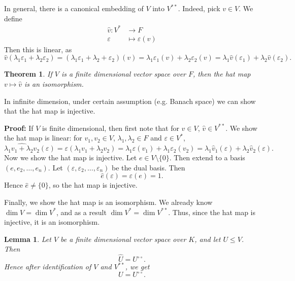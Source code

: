 \documentclass[12pt]{article}
\newtheorem{theorem}{Theorem}[section]
\newtheorem{lemma}{Lemma}[section]
\theoremstyle{definition}
\theoremstyle{remark}
\begin{document}
In general, there is a canonical embedding of $V$ into $V^{\ast \ast}$. Indeed, pick $v \in V$. We define
\begin{align*}
	\hat v : V^{\ast} &\to F \\
	\varepsilon &\mapsto \varepsilon(v)
\end{align*}
Then this is linear, as
\[
	\hat v(\lambda_1 \varepsilon_1 + \lambda_2 \varepsilon_2) = (\lambda_1 \varepsilon_1 + \lambda_2 + \varepsilon_2)(v) = \lambda_1 \varepsilon_1(v) + \lambda_2 \varepsilon_2(v) = \lambda_1 \hat v(\varepsilon_1) + \lambda_2 \hat v(\varepsilon_2)
.\]

\begin{theorem}
	If $V$ is a finite dimensional vector space over $F$, then the hat map $v \mapsto \hat v$ is an isomorphism.
\end{theorem}

In infinite dimension, under certain assumption (e.g. Banach space) we can show that the hat map is injective.

\begin{adjustbox}{minipage = \columnwidth - 25.5pt, margin=1em, frame=1pt, margin=0em}
	\textbf{Proof:} If $V$ is finite dimensional, then first note that for $v \in V$, $\hat v \in V^{\ast \ast}$. We show the hat map is linear: for $v_1, v_2 \in V$, $\lambda_1, \lambda_2 \in F$ and $\varepsilon \in V^{\ast}$,
	\[
		\widehat{\lambda_1 v_1 + \lambda_2 v_2} (\varepsilon) = \varepsilon(\lambda_1 v_1 + \lambda_2 v_2) = \lambda_1 \varepsilon(v_1) + \lambda_1 \varepsilon_2(v_2) = \lambda_1 \hat v_1(\varepsilon) + \lambda_2 \hat v_2 (\varepsilon)
	.\]
	Now we show the hat map is injective. Let $e \in V \setminus \{0\}$. Then extend to a basis $(e, e_2, \ldots, e_n)$. Let $(\varepsilon, \varepsilon_2, \ldots, \varepsilon_n)$ be the dual basis. Then
	\[
		\hat e (\varepsilon) = \varepsilon(e) = 1
	.\]
	Hence $\hat e \neq \{0\}$, so the hat map is injective.

	Finally, we show the hat map is an isomorphism. We already know $\dim V = \dim V^{\ast}$, and as a result $\dim V^{\ast} = \dim V^{\ast \ast}$. Thus, since the hat map is injective, it is an isomorphism.
\end{adjustbox}

\begin{lemma}
	Let $V$ be a finite dimensional vector space over $K$, and let $U \leq V$. Then
	\[
	\hat U = U^{\circ \circ}
	.\]
	Hence after identification of $V$ and $V^{\ast \ast}$, we get
	\[
	U = U^{\circ \circ}
	.\]
\end{lemma}
\end{document}
